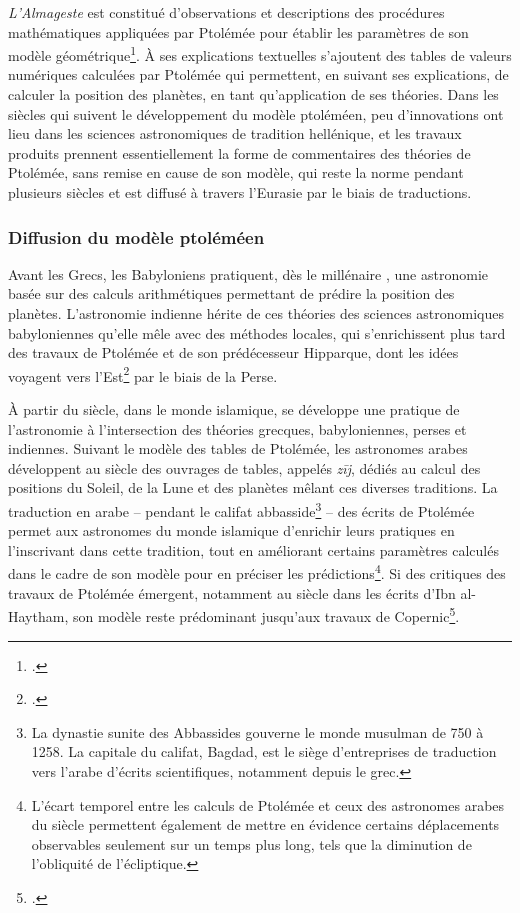 	\textit{L'Almageste} est constitué d'observations et descriptions des procédures mathématiques appliquées par Ptolémée pour établir les paramètres de son modèle géométrique\footcite{evansHistoryAstronomy}. À ses explications textuelles s'ajoutent des tables de valeurs numériques calculées par Ptolémée qui permettent, en suivant ses explications, de calculer la position des planètes, en tant qu'application de ses théories. Dans les siècles qui suivent le développement du modèle ptoléméen, peu d'innovations ont lieu dans les sciences astronomiques de tradition hellénique, et les travaux produits prennent essentiellement la forme de commentaires des théories de Ptolémée, sans remise en cause de son modèle, qui reste la norme pendant plusieurs siècles et est diffusé à travers l'Eurasie par le biais de traductions.

    \subsubsection{Diffusion du modèle ptoléméen}
	Avant les Grecs, les Babyloniens pratiquent, dès le \ist millénaire \jc, une astronomie basée sur des calculs arithmétiques permettant de prédire la position des planètes. L'astronomie indienne hérite de ces théories des sciences astronomiques babyloniennes qu'elle mêle avec des méthodes locales, qui s'enrichissent plus tard des travaux de Ptolémée et de son prédécesseur Hipparque, dont les idées voyagent vers l'Est\footcite{evansHistoryAstronomy} par le biais de la Perse.
	
	À partir du \viii siècle, dans le monde islamique, se développe une pratique de l'astronomie à l'intersection des théories grecques, babyloniennes, perses et indiennes. Suivant le modèle des tables de Ptolémée, les astronomes arabes développent au \ix siècle des ouvrages de tables, appelés \textit{zīj}, dédiés au calcul des positions du Soleil, de la Lune et des planètes mêlant ces diverses traditions. La traduction en arabe -- pendant le califat abbasside\footnote{La dynastie sunite des Abbassides gouverne le monde musulman de 750 à 1258. La capitale du califat, Bagdad, est le siège d'entreprises de traduction vers l'arabe d'écrits scientifiques, notamment depuis le grec.} -- des écrits de Ptolémée permet aux astronomes du monde islamique d'enrichir leurs pratiques en l'inscrivant dans cette tradition, tout en améliorant certains paramètres calculés dans le cadre de son modèle pour en préciser les prédictions\footnote{L'écart temporel entre les calculs de Ptolémée et ceux des astronomes arabes du \ix siècle permettent également de mettre en évidence certains déplacements observables seulement sur un temps plus long, tels que la diminution de l'obliquité de l'écliptique.}. Si des critiques des travaux de Ptolémée émergent, notamment au \xie siècle dans les écrits d'Ibn al-Haytham, son modèle reste prédominant jusqu'aux travaux de Copernic\footcite{evansHistoryAstronomy}.
	

